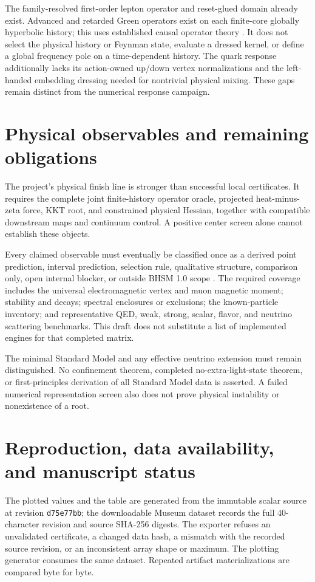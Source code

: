 \documentclass[11pt]{article}
\begin{document}
The family-resolved first-order lepton operator and reset-glued domain
already exist. Advanced and retarded Green operators exist on each
finite-core globally hyperbolic history; this uses established causal
operator theory \cite{baer}. It does not select the physical history or
Feynman state, evaluate a dressed kernel, or define a global frequency pole
on a time-dependent history. The quark response additionally lacks its
action-owned up/down vertex normalizations and the left-handed embedding
dressing needed for nontrivial physical mixing. These gaps remain distinct
from the numerical response campaign.

\section{Physical observables and remaining obligations}
The project's physical finish line is stronger than successful local
certificates. It requires the complete joint finite-history operator oracle,
projected heat-minus-zeta force, KKT root, and constrained physical Hessian,
together with compatible downstream maps and continuum control. A positive
center screen alone cannot establish these objects.

Every claimed observable must eventually be classified once as a derived
point prediction, interval prediction, selection rule, qualitative structure,
comparison only, open internal blocker, or outside BHSM 1.0 scope
\cite{dod}. The required coverage includes the universal electromagnetic
vertex and muon magnetic moment; stability and decays; spectral enclosures
or exclusions; the known-particle inventory; and representative QED, weak,
strong, scalar, flavor, and neutrino scattering benchmarks. This draft
does not substitute a list of implemented engines for that completed matrix.

The minimal Standard Model and any effective neutrino extension must remain
distinguished. No confinement theorem, completed no-extra-light-state
theorem, or first-principles derivation of all Standard Model data is asserted.
A failed numerical representation screen also does not prove physical
instability or nonexistence of a root.

\section{Reproduction, data availability, and manuscript status}
The plotted values and the table are generated from the immutable scalar
source at revision \texttt{d75e77bb}; the downloadable Museum dataset records
the full 40-character revision and source SHA-256 digests. The exporter
refuses an unvalidated certificate, a changed data hash, a mismatch with
the recorded source revision, or an inconsistent array shape or maximum.
The plotting generator consumes the same dataset. Repeated artifact
materializations are compared byte for byte.
\end{document}
